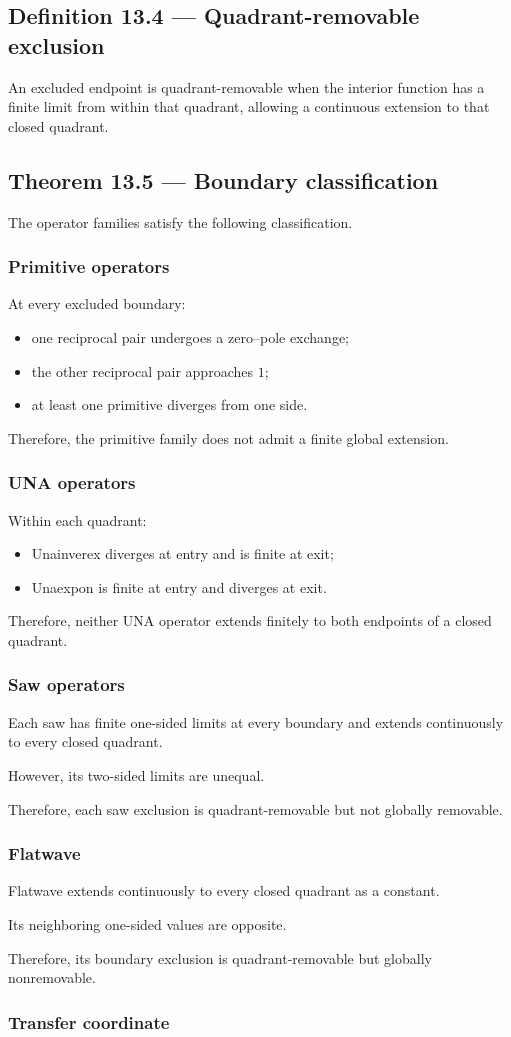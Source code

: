 \documentclass[11pt,oneside,openany]{book}
\newcommand{\PCsubsection}[1]{%
  \subsection*{#1}%
}
\newcommand{\PCsubsubsection}[1]{%
  \subsubsection*{#1}%
}
\begin{document}
\PCsubsection{Definition 13.4 --- Quadrant-removable exclusion}

An excluded endpoint is quadrant-removable when the interior function has a finite limit from within that quadrant, allowing a continuous extension to that closed quadrant.

\PCsubsection{Theorem 13.5 --- Boundary classification}

The operator families satisfy the following classification.

\PCsubsubsection{Primitive operators}

At every excluded boundary:

\begin{itemize}
\item one reciprocal pair undergoes a zero–pole exchange;
\item the other reciprocal pair approaches \(1\);
\item at least one primitive diverges from one side.
\end{itemize}
Therefore, the primitive family does not admit a finite global extension.

\PCsubsubsection{UNA operators}

Within each quadrant:

\begin{itemize}
\item Unainverex diverges at entry and is finite at exit;
\item Unaexpon is finite at entry and diverges at exit.
\end{itemize}
Therefore, neither UNA operator extends finitely to both endpoints of a closed quadrant.

\PCsubsubsection{Saw operators}

Each saw has finite one-sided limits at every boundary and extends continuously to every closed quadrant.

However, its two-sided limits are unequal.

Therefore, each saw exclusion is quadrant-removable but not globally removable.

\PCsubsubsection{Flatwave}

Flatwave extends continuously to every closed quadrant as a constant.

Its neighboring one-sided values are opposite.

Therefore, its boundary exclusion is quadrant-removable but globally nonremovable.

\PCsubsubsection{Transfer coordinate}
\end{document}
